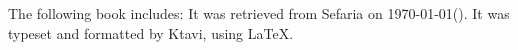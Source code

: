 \documentclass[12pt, openany]{book}
\begin{document}
\frontmatter
{}

\title{\texttitle}

\author{}

\date{}

\maketitle

\begin{minipage}[b][\textheight][b]{\textwidth}\englishfont	
	\begin{english}
		\vfill
		The following book includes:
		It was retrieved from Sefaria on \today\space \texthebrew{(\Hebrewtoday)}.  It was typeset and formatted by Ktavi, using \LaTeX .
		\clearpage
		
	\end{english}
\end{minipage}


\tableofcontents

\clearpage
\mainmatter
{}

\end{document}
